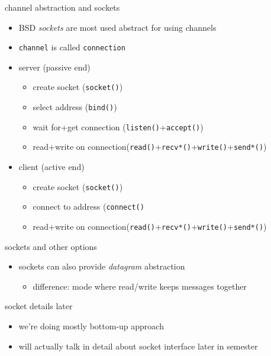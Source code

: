 \begin{frame}{channel abstraction and sockets}
    \begin{itemize}
    \item BSD \textit{sockets} are most used abstract for using channels
    \item \texttt{channel} is called \texttt{connection}
    \item server (passive end)
        \begin{itemize}
        \item create socket (\texttt{socket()})
        \item select address (\texttt{bind()})
        \item wait for+get connection (\texttt{listen()}+\texttt{accept()})
        \item read+write on connection(\texttt{read()}+\texttt{recv*()}+\texttt{write()}+\texttt{send*()})
        \end{itemize}
    \item client (active end)
        \begin{itemize}
        \item create socket (\texttt{socket()})
        \item connect to address (\texttt{connect()}
        \item read+write on connection(\texttt{read()}+\texttt{recv*()}+\texttt{write()}+\texttt{send*()})
        \end{itemize}
    \end{itemize}
\end{frame}

\begin{frame}{sockets and other options}
    \begin{itemize}
    \item sockets can also provide \textit{datagram} abstraction
        \begin{itemize}
        \item difference: mode where read/write keeps messages together
        \end{itemize}
    \end{itemize}
\end{frame}

\begin{frame}{socket details later}
    \begin{itemize}
    \item we're doing mostly bottom-up approach
    \item will actually talk in detail about socket interface later in semester
    \end{itemize}
\end{frame}
